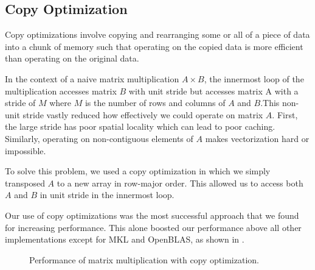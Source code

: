 \subsection{Copy Optimization}
Copy optimizations involve copying and rearranging some or all of a piece of
data into a chunk of memory such that operating on the copied data is more
efficient than operating on the original data.

In the context of a naive matrix multiplication $A \times B$, the innermost
loop of the multiplication accesses matrix $B$ with unit stride but accesses
matrix A with a stride of $M$ where $M$ is the number of rows and columns of
$A$ and $B$.This non-unit stride vastly reduced how effectively we could
operate on matrix $A$. First, the large stride has poor spatial locality which
can lead to poor caching. Similarly, operating on non-contiguous elements of
$A$ makes vectorization hard or impossible.

To solve this problem, we used a copy optimization in which we simply
transposed $A$ to a new array in row-major order. This allowed us to access
both $A$ and $B$ in unit stride in the innermost loop.

Our use of copy optimizations was the most successful approach that we found
for increasing performance. This alone boosted our performance above all other
implementations except for MKL and OpenBLAS, as shown in .

\begin{figure}[h]
  \centering
  \caption{Performance of matrix multiplication with copy optimization.}
  \label{fig:copy}
\end{figure}
